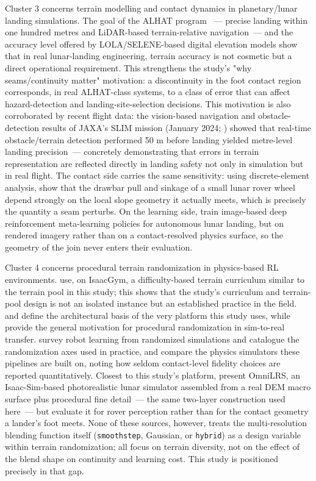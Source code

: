 Cluster 3 concerns terrain modelling and contact dynamics in planetary/lunar landing simulations. The goal of the ALHAT program \citep{johnson2008,nasajpl}~--- precise landing within one hundred metres and LiDAR-based terrain-relative navigation~--- and the accuracy level offered by LOLA/SELENE-based digital elevation models \citep{barker2016} show that in real lunar-landing engineering, terrain accuracy is not cosmetic but a direct operational requirement. This strengthens the study's "why seams/continuity matter" motivation: a discontinuity in the foot contact region corresponds, in real ALHAT-class systems, to a class of error that can affect hazard-detection and landing-site-selection decisions. This motivation is also corroborated by recent flight data: the vision-based navigation and obstacle-detection results of JAXA's SLIM mission (January 2024; \citealp{ishida2025}) showed that real-time obstacle/terrain detection performed 50 m before landing yielded metre-level landing precision~--- concretely demonstrating that errors in terrain representation are reflected directly in landing safety not only in simulation but in real flight. The contact side carries the same sensitivity: using discrete-element analysis, \citet{nakashima2010} show that the drawbar pull and sinkage of a small lunar rover wheel depend strongly on the local slope geometry it actually meets, which is precisely the quantity a seam perturbs. On the learning side, \citet{scorsoglio2021} train image-based deep reinforcement meta-learning policies for autonomous lunar landing, but on rendered imagery rather than on a contact-resolved physics surface, so the geometry of the join never enters their evaluation.

Cluster 4 concerns procedural terrain randomization in physics-based RL environments. \citet{rudin2022} use, on IsaacGym, a difficulty-based terrain curriculum similar to the terrain pool in this study; this shows that the study's curriculum and terrain-pool design is not an isolated instance but an established practice in the field. \citet{mittal2023} and \citet{nvidia2025} define the architectural basis of the very platform this study uses, while \citet{tobin2017} provide the general motivation for procedural randomization in sim-to-real transfer. \citet{muratore2022} survey robot learning from randomized simulations and catalogue the randomization axes used in practice, and \citet{collins2021} compare the physics simulators these pipelines are built on, noting how seldom contact-level fidelity choices are reported quantitatively. Closest to this study's platform, \citet{richard2024} present OmniLRS, an Isaac-Sim-based photorealistic lunar simulator assembled from a real DEM macro surface plus procedural fine detail~--- the same two-layer construction used here~--- but evaluate it for rover perception rather than for the contact geometry a lander's foot meets. None of these sources, however, treats the multi-resolution blending function itself (\texttt{smoothstep}, Gaussian, or \texttt{hybrid}) as a design variable within terrain randomization; all focus on terrain diversity, not on the effect of the blend shape on continuity and learning cost. This study is positioned precisely in that gap.

